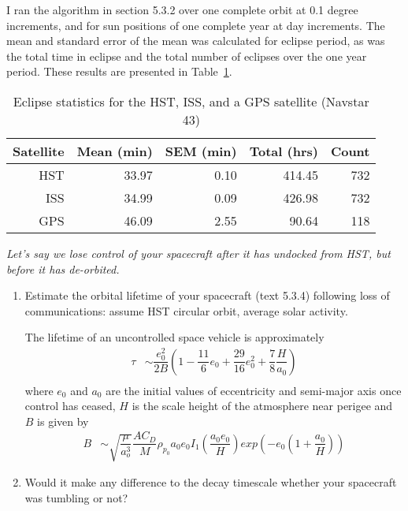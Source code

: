 \documentclass[onecolumn,10pt]{jhwhw}
\begin{document}
I ran the algorithm in section 5.3.2 over one complete orbit at 0.1 degree increments, and for sun positions of one complete year at day increments. The mean and standard error of the mean was calculated for eclipse period, as was the total time in eclipse and the total number of eclipses over the one year period. These results are presented in Table~\ref{p2table}.

\begin{table}[h]
\begin{center}
\begin{tabular}{rrrrr}
\toprule
Satellite & Mean (min) & SEM (min) & Total (hrs) & Count \\
\midrule
HST & 33.97 & 0.10 & 414.45 & 732 \\
ISS & 34.99 & 0.09 & 426.98 & 732 \\
GPS & 46.09 & 2.55 &  90.64 & 118 \\
\bottomrule
\end{tabular}
\end{center}
\caption{Eclipse statistics for the HST, ISS, and a GPS satellite (Navstar 43)}
\label{p2table}
\end{table}

\clearpage

\problem{}
\textit{Let’s say we lose control of your spacecraft after it has undocked from HST, but before it has de-orbited.}
\begin{enumerate}
\itemsep0em
\item Estimate the orbital lifetime of your spacecraft (text 5.3.4) following loss of communications: assume HST circular orbit, average solar activity.

The lifetime of an uncontrolled space vehicle is approximately
\begin{align*}
\tau &\sim \dfrac{e_0^2}{2B} \left( 1 - \dfrac{11}{6}e_0 + \dfrac{29}{16}e_0^2 + \dfrac{7}{8} \dfrac{H}{a_0} \right) \\
\end{align*}
where $e_0$ and $a_0$ are the initial values of eccentricity and semi-major axis once control has ceased, $H$ is the scale height of the atmosphere near perigee and $B$ is given by
\begin{align*}
B &\sim \sqrt{\dfrac{\mu}{a_o^3}} \dfrac{A C_D}{M} \rho_{p_0} a_0 e_0 I_1 \left( \dfrac{a_0 e_0}{H} \right) exp \left(-e_0 \left(1 + \dfrac{a_0}{H} \right) \right)
\end{align*}

\item Would it make any difference to the decay timescale whether your spacecraft was tumbling or not?
\end{enumerate}
\end{document}
